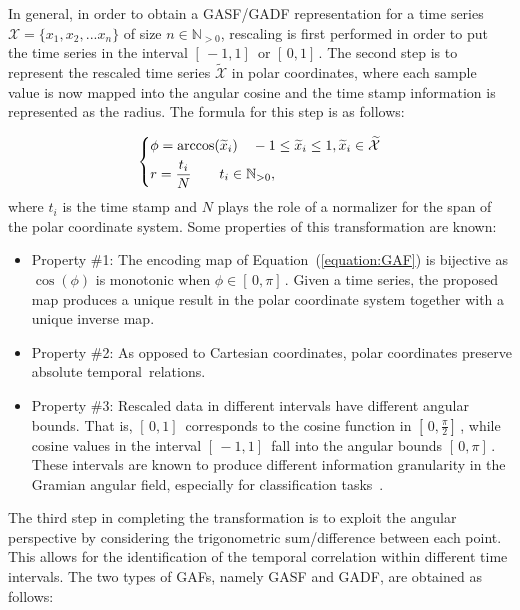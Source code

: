In general, in order to obtain a GASF/GADF representation for a time series $\mathcal{X}=\{x_{1}, x_{2}, ... x_{n}\}$ of size $n \in \mathbb{N}_{>0}$, rescaling is first performed in order to put the time series in the interval $[\,-1,1] \,$ or $[\,0,1]\,$. The second step is to represent the rescaled time series $\widetilde{\mathcal{X}}$ in polar coordinates, where each sample value is now mapped into the angular cosine and the time stamp information is represented as the radius. 
The formula for this step is as follows:

\begin{equation}
\begin{dcases}
  \phi = \arccos(\widetilde{x}_{i}) \quad -1 \leq \widetilde{x}_{i} \leq 1, \widetilde{x}_{i} \in \widetilde{\mathcal{X}} \\
  r = \frac{t_{i}}{N} \quad \quad t_{i} \in \mathbb{N}_{>0},
\end{dcases}
\label{equation:GAF}
\end{equation} 
where $t_{i}$ is the time stamp and $N$ plays the role of a normalizer for the span of the polar coordinate system. Some properties of this transformation are known:

\begin{itemize}[leftmargin=*,labelsep=5.8mm]
\item {Property \#1}: The encoding map of Equation~(\ref{equation:GAF}) is bijective as $\cos(\phi)$ is monotonic when $\phi \in [\,0,\pi]\,$. Given a time series, the proposed map produces a unique result in the polar coordinate system together with a unique inverse map. 
\item {Property \#2}: As opposed to Cartesian coordinates, polar coordinates preserve absolute temporal~relations.
\item {Property \#3}: Rescaled data in different intervals have different angular bounds. That is, $[\,0,1]\,$ corresponds to the cosine function in $[\,0,\frac{\pi}{2}]\,$, while cosine values in the interval $[\,-1,1]\,$ fall into the angular bounds $[\,0,\pi]\,$. These intervals are known to produce different information granularity in the Gramian angular field, especially for classification tasks~\cite{wang_imaging_2015}.
\end{itemize}

The third step in completing the transformation is to exploit the angular perspective by considering the trigonometric sum/difference between each point. This allows for the identification of the temporal correlation within different time intervals. The two types of GAFs, namely GASF and GADF, are obtained as follows:

